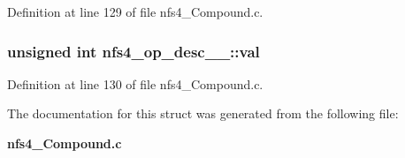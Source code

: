 Definition at line 129 of file nfs4\_\-Compound.c.
\subsubsection[{val}]{\setlength{\rightskip}{0pt plus 5cm}unsigned int {\bf nfs4\_\-op\_\-desc\_\-\_\-::val}}\label{structnfs4__op__desc_____168c7621645c370c859e5fe914df7ad7}




Definition at line 130 of file nfs4\_\-Compound.c.

The documentation for this struct was generated from the following file:\begin{CompactItemize}
\item 
{\bf nfs4\_\-Compound.c}\end{CompactItemize}
